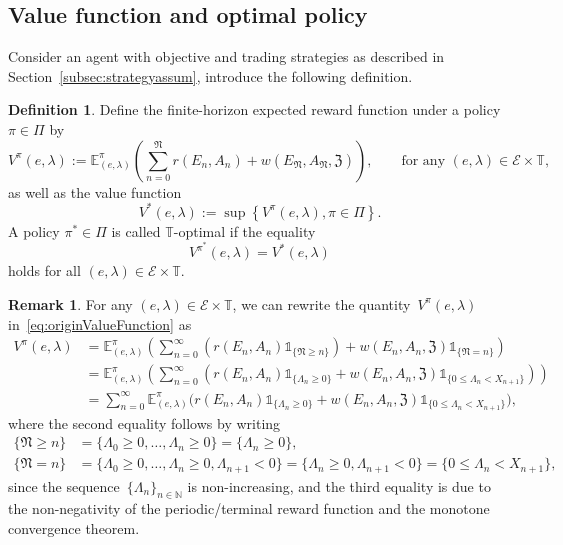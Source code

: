 \documentclass{amsart}[11pt]
\numberwithin{equation}{section}
\theoremstyle{definition}
\newtheorem{definition}[theorem]{Definition}
\newtheorem{remark}[theorem]{Remark}
\newcommand{\ind}{\mathds{1}} %
\newcommand{\NN}{\mathbb{N}}
\newcommand{\Ee}{\mathcal{E}}
\newcommand{\EE}{\mathbb{E}}
\newcommand{\Nn}{\mathfrak{N}}
\newcommand{\TT}{\mathbb{T}}
\newcommand{\ZZ}{\mathfrak{Z}}
\begin{document}
\subsection{Value function and optimal policy}\label{sec:OptimalStrategy}\label{sec:vfOptimalStrategy}
Consider an agent with objective and trading strategies as described in Section~\ref{subsec:strategyassum}, introduce the following definition.
\begin{definition}\label{Def:expectedReward}
Define the {finite-horizon expected reward function} under a policy~$\pi\in \Pi$ by
\begin{equation}\label{eq:originValueFunction}
V^{\pi}(e, \lambda)
:= \EE^{\pi}_{(e, \lambda)}
\left(\displaystyle\sum_{n = 0}^{\Nn}r(E_n, A_n)
 + w(E_\Nn, A_\Nn, \ZZ)\right),
 \qquad\text{for any~$(e, \lambda)\in \Ee\times\TT$},
\end{equation}
as well as the value function
\begin{equation}\label{eq:VF}
V^*(e, \lambda) := \sup\left\{V^\pi(e, \lambda), \pi\in \Pi\right\}.
\end{equation}
A policy $\pi^*\in \Pi$ is called $\TT$-optimal if the equality
\begin{equation}\label{eq:optimalpolicy}
V^{\pi^*} (e, \lambda) = V^*(e, \lambda)
\end{equation}
holds for all $(e, \lambda)\in \Ee\times \TT$.
\end{definition}
\begin{remark}\label{rmk:vfchange}
For any $(e,\lambda) \in \Ee\times\TT$, we can rewrite the quantity~$V^\pi(e,\lambda)$ 
in~\eqref{eq:originValueFunction} as
\begin{align*}
V^\pi(e, \lambda) & =
 \EE^{\pi}_{(e, \lambda)}\left(\displaystyle\sum_{n = 0}^{\infty}
\left(r(E_n, A_n)\ind_{\{\Nn \geq n\}}\right)
 + w(E_n, A_n, \ZZ)\ind_{\{\Nn = n\}}\right)\\
 & = \EE^{\pi}_{(e, \lambda)}\left(\displaystyle\sum_{n = 0}^{\infty}
\left(r(E_n, A_n)\ind_{\{\Lambda_n\geq 0\}}
 + \displaystyle w(E_n, A_n, \ZZ)\ind_{\{0\leq\Lambda_n < X_{n+1}\}}\right)\right)\\
 & =
 \displaystyle\sum_{n=0}^\infty \EE_{(e, \lambda)}^\pi\Big(
 r(E_n, A_n)\ind_{\{\Lambda_n\geq 0\}}
 + w(E_n, A_n, \ZZ)\ind_{\{0\leq\Lambda_n < X_{n+1}\}}
\Big),
\end{align*}
where the second equality follows by writing
\begin{align*}
\{\Nn\geq n\} &= \{\Lambda_0 \geq0, \dots, \Lambda_n\geq 0\} = \{\Lambda_n \geq 0\},\\
\{\Nn = n\} & = \{\Lambda_0 \geq0, \dots, \Lambda_n\geq 0, \Lambda_{n+1}<0\} = \{\Lambda_n\geq 0, \Lambda_{n+1}<0\}
 = \{0\leq \Lambda_{n} < X_{n+1}\},
\end{align*}
since the sequence~$\{\Lambda_n\}_{n\in\NN}$ is non-increasing,
and the third equality is due to the non-negativity of the periodic/terminal reward function and the monotone convergence theorem.
\end{remark}
\end{document}

